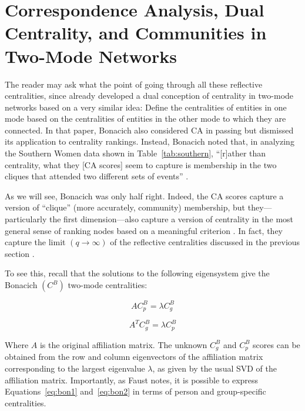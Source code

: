 \documentclass[a4paper,fleqn]{cas-sc}
\begin{document}
\section{Correspondence Analysis, Dual Centrality, and Communities in Two-Mode Networks}
The reader may ask what the point of going through all these reflective centralities, since \citet{bonacich1991simultaneous} already developed a dual conception of centrality in two-mode networks based on a very similar idea: Define the centralities of entities in one mode based on the centralities of entities in the other mode to which they are connected. In that paper, Bonacich also considered CA in passing but dismissed its application to centrality rankings. Instead, Bonacich noted that, in analyzing the Southern Women data shown in Table~\ref{tab:southern}, ``[r]ather than centrality, what they [CA scores] seem to capture is membership in the two cliques that attended two different sets of events'' \citeyearpar[164]{bonacich1991simultaneous}. 

As we will see, Bonacich was only half right. Indeed, the CA scores capture a version of ``clique'' (more accurately, community) membership, but they---particularly the first dimension---also capture a version of centrality in the most general sense of ranking nodes based on a meaningful criterion \citep{borgatti2006graph}. In fact, they capture the limit $(q \rightarrow \infty)$ of the reflective centralities discussed in the previous section \citep{mealy2019interpreting}. 

To see this, recall that the solutions to the following eigensystem give the Bonacich $(C^B)$ two-mode centralities:

\begin{equation}
    AC^B_p = \lambda C^B_g 
    \label{eq:bon1}
\end{equation}

\begin{equation}
    A^TC^B_g = \lambda C^B_p 
    \label{eq:bon2}
\end{equation}

Where $A$ is the original affiliation matrix. The unknown $C^B_g$ and $C^B_p$ scores can be obtained from the row and column eigenvectors of the affiliation matrix corresponding to the largest eigenvalue $\lambda$, as given by the usual SVD of the affiliation matrix. Importantly, as Faust \citeyearpar[170]{faust1997centrality} notes, it is possible to express Equations~\ref{eq:bon1} and~\ref{eq:bon2} in terms of person and group-specific centralities. 
\end{document}

